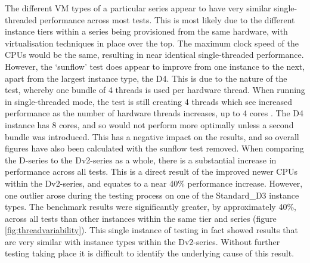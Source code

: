 \documentclass{entcs} \usepackage{entcsmacro}
\begin{document}
The different VM types of a particular series appear to have very similar single-threaded performance across most tests. This is most likely due to the different instance tiers within a series being provisioned from the same hardware, with virtualisation techniques in place over the top. The maximum clock speed of the CPUs would be the same, resulting in near identical single-threaded performance. However, the `sunflow' test does appear to improve from one instance to the next, apart from the largest instance type, the D4. This is due to the nature of the test, whereby one bundle of 4 threads is used per hardware thread. When running in single-threaded mode, the test is still creating 4 threads which see increased performance as the number of hardware threads increases, up to 4 cores \cite{shiv2009specjvm2008}. The D4 instance has 8 cores, and so would not perform more optimally unless a second bundle was introduced. This has a negative impact on the results, and so overall figures have also been calculated with the sunflow test removed. When comparing the D-series to the Dv2-series as a whole, there is a substantial increase in performance across all tests. This is a direct result of the improved newer CPUs within the Dv2-series, and equates to a near 40\% performance increase. However, one outlier arose during the testing process on one of the Standard\_D3 instance types. The benchmark results were significantly greater, by approximately 40\%, across all tests than other instances within the same tier and series (figure \ref{fig:threadvariability}). This single instance of testing in fact showed results that are very similar with instance types within the Dv2-series. Without further testing taking place it is difficult to identify the underlying cause of this result.

\end{document}
